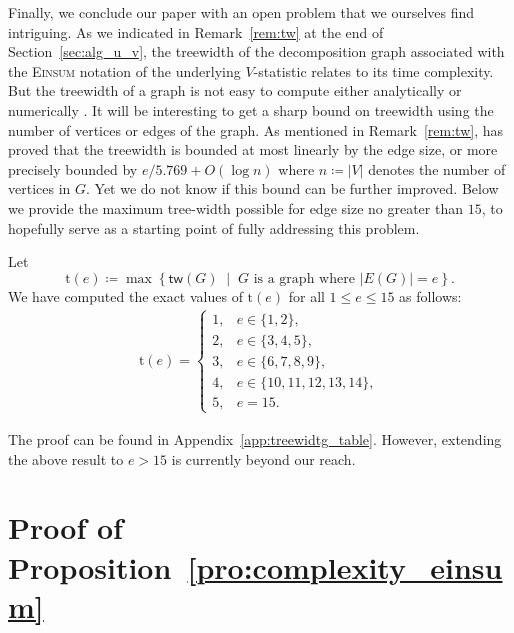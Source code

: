 \documentclass[twoside,11pt]{article}
\def\Einsum{\textsc{Einsum}}
\newcommand{\treewidthp}[1]{\mathsf{tw}(#1)}
\begin{document}
Finally, we conclude our paper with an open problem that we ourselves find intriguing. As we indicated in Remark~\ref{rem:tw} at the end of Section~\ref{sec:alg_u_v}, the treewidth of the decomposition graph associated with the \Einsum{} notation of the underlying $V$-statistic relates to its time complexity. But the treewidth of a graph is not easy to compute either analytically \citep{harvey2018treewidth} or numerically \citep{arnborg1987complexity}. It will be interesting to get a sharp bound on treewidth using the number of vertices or edges of the graph. As mentioned in Remark~\ref{rem:tw}, \citet{kneis2009bound} has proved that the treewidth is bounded at most linearly by the edge size, or more precisely bounded by $e / 5.769 + O (\log n)$ where $n \coloneqq |V|$ denotes the number of vertices in $G$. Yet we do not know if this bound can be further improved. Below we provide the maximum tree-width possible for edge size no greater than $15$, to hopefully serve as a starting point of fully addressing this problem.
\begin{observation}
\label{pro:treewidth_table}
Let
\begin{equation*}
\mathrm{t}(e) \coloneqq \max \left\{ \treewidthp{G} \;\middle|\; G \text{ is a graph where } |E(G)| = e \right\}.
\end{equation*}
We have computed the exact values of $\mathrm{t} (e)$ for all $1 \le e \le 15$ as follows:
\begin{equation*}
\begin{split}
\mathrm{t} (e) = \left\{ \begin{array}{ll}
1, & e \in \{1, 2\}, \\
2, & e \in \{3, 4, 5\}, \\
3, & e \in \{6, 7, 8, 9\}, \\
4, & e \in \{10, 11, 12, 13, 14\}, \\
5, & e = 15.
\end{array} \right.
\end{split}
\end{equation*}
\end{observation}
\noindent The proof can be found in Appendix~\ref{app:treewidtg_table}. However, extending the above result to $e > 15$ is currently beyond our reach.



\appendix

\section{Proof of Proposition~\ref{pro:complexity_einsum}}
\label{app:complexity_einsum}
\end{document}
